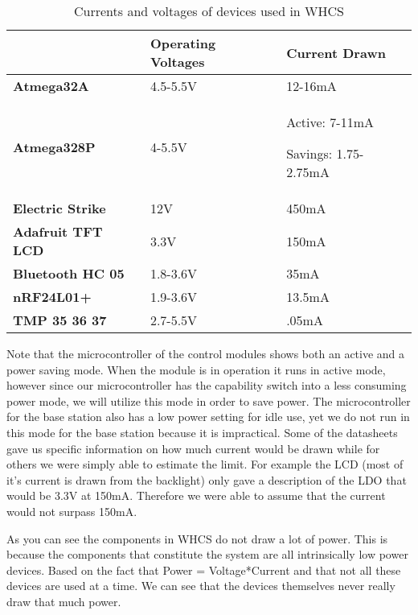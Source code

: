 \begin{table}[H]
\begin{tabular}{|l|l|l|}
\hline
 &
{\color{black} \textbf{Operating Voltages}} &
{\color{black} \textbf{Current Drawn}}\\\hline
{\color{black} \textbf{Atmega32A}} &
{\color{black} 4.5-5.5V } &
{\color{black} 12-16mA}\\\hline
{\color{black} \textbf{Atmega328P}} &
{\color{black} 4-5.5V} &
{\color{black} Active: 7-11mA }

{\color{black} Savings: 1.75-2.75mA}\\\hline
{\color{black} \textbf{Electric Strike }} &
{\color{black} 12V} &
{\color{black} 450mA}\\\hline
{\color{black} \textbf{Adafruit TFT LCD}} &
{\color{black} 3.3V} &
{\color{black} 150mA}\\\hline
{\color{black} \textbf{Bluetooth HC 05}} &
{\color{black} 1.8-3.6V} &
{\color{black} 35mA}\\\hline
{\color{black} \textbf{nRF24L01+}} &
{\color{black} 1.9-3.6V}

 &
{\color{black} 13.5mA}\\\hline
{\color{black} \textbf{TMP 35 36 37 }} &
{\color{black} 2.7-5.5V} &
{\color{black} .05mA}\\\hline
\end{tabular}
\caption{Currents and voltages of devices used in WHCS}
\label{tab:pwr-current}
\end{table}

Note that the microcontroller of the control modules shows both an active and a
power saving mode. When the module is in operation it runs in active mode,
however since our microcontroller has the capability switch into a less
consuming power mode, we will utilize this mode in order to save power. The
microcontroller for the base station also has a low power setting for idle use,
yet we do not run in this mode for the base station because it is
impractical. Some of the datasheets gave us specific information on how much
current would be drawn while for others we were simply able to estimate the
limit. For example the LCD (most of it{}'s current is drawn from the
backlight) only gave a description of the LDO that would be 3.3V at 150mA.
Therefore we were able to assume that the current would not surpass 150mA.

As you can see the components in WHCS do not draw a lot of power. This is
because the components that constitute the system are all intrinsically low power
devices.  Based on the fact that Power = Voltage*Current and that not all these
devices are used at a time. We can see that the devices themselves
never really draw that much power.


